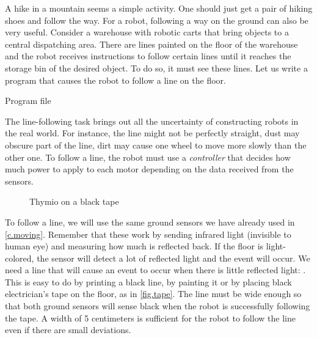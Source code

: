 \label{ch.line}

A hike in a mountain seems a simple activity.
One should just get a pair of hiking shoes and follow the way.
For a robot, following a way on the ground can also be very useful.
Consider a warehouse with robotic carts that bring objects to a central dispatching area.
There are lines painted on the floor of the warehouse and the robot receives instructions to follow
certain lines until it reaches the storage bin of the desired object.
To do so, it must see these lines.
Let us write a program that causes the robot to follow a line on the floor.

{\raggedleft \hfill Program file }

The line-following task brings out all the uncertainty of constructing
robots in the real world.
For instance, the line might not be perfectly straight, dust may obscure part of the line, dirt may cause one wheel to move more slowly than the other one.
To follow a line, the robot must use a
\emph{controller} that decides how much power to apply to each motor
depending on the data received from the sensors.


\begin{figure}
	\hfill
	\caption{Thymio on a black tape}
\end{figure}

To follow a line, we will use the same ground sensors we have already used in \cref{c.moving}.
Remember that these work by sending infrared light (invisible to human eye) and measuring how much is reflected back.
If the floor is light-colored, the sensor will detect a lot of reflected
light and the event  will occur. We need a line
that will cause an event to occur when there is little reflected light:
. This is easy to do by printing a black line, by painting it or by placing black
electrician's tape on the floor, as in \cref{fig.tape}. The line must
be wide enough so that both ground sensors will sense black when the
robot is successfully following the tape. A width of 5
centimeters is sufficient for the robot to follow the line even if there
are small deviations.

